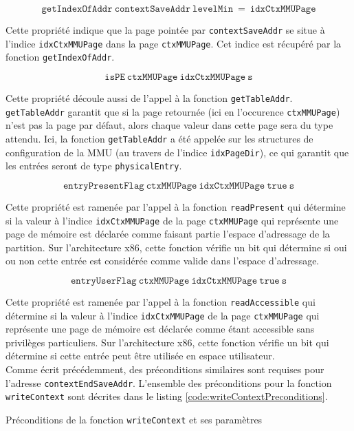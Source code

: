 			$$\mathtt{getIndexOfAddr~contextSaveAddr~levelMin}~=~\mathtt{idxCtxMMUPage}$$

			Cette propriété indique que la page pointée par \texttt{contextSaveAddr} se situe à l'indice \texttt{idxCtxMMUPage} dans la page \texttt{ctxMMUPage}. Cet indice est récupéré par la fonction \texttt{getIndexOfAddr}.

			$$\mathtt{isPE~ctxMMUPage~idxCtxMMUPage~s}$$

			Cette propriété découle aussi de l'appel à la fonction \texttt{getTableAddr}. \texttt{getTableAddr} garantit que si la page retournée (ici en l'occurence \texttt{ctxMMUPage}) n'est pas la page par défaut, alors chaque valeur dans cette page sera du type attendu. Ici, la fonction \texttt{getTableAddr} a été appelée sur les structures de configuration de la MMU (au travers de l'indice \texttt{idxPageDir}), ce qui garantit que les entrées seront de type \texttt{physicalEntry}.

			$$\mathtt{entryPresentFlag~ctxMMUPage~idxCtxMMUPage~true~s}$$

			Cette propriété est ramenée par l'appel à la fonction \texttt{readPresent} qui détermine si la valeur à l'indice \texttt{idxCtxMMUPage} de la page \texttt{ctxMMUPage} qui représente une page de mémoire est déclarée comme faisant partie l'espace d'adressage de la partition. Sur l'architecture x86, cette fonction vérifie un bit qui détermine si oui ou non cette entrée est considérée comme valide dans l'espace d'adressage.

			$$\mathtt{entryUserFlag~ctxMMUPage~idxCtxMMUPage~true~s}$$

			Cette propriété est ramenée par l'appel à la fonction \texttt{readAccessible} qui détermine si la valeur à l'indice \texttt{idxCtxMMUPage} de la page \texttt{ctxMMUPage} qui représente une page de mémoire est déclarée comme étant accessible sans privilèges particuliers. Sur l'architecture x86, cette fonction vérifie un bit qui détermine si cette entrée peut être utilisée en espace utilisateur.\\

			Comme écrit précédemment, des préconditions similaires sont requises pour l'adresse \texttt{contextEndSaveAddr}. L'ensemble des préconditions pour la fonction \texttt{writeContext} sont décrites dans le listing \ref{code:writeContextPreconditions}.

			
			\newpage

			\begin{listing}[!ht]
				\caption{Préconditions de la fonction \texttt{writeContext} et ses paramètres}
				\label{code:writeContextPreconditions}
			\end{listing}

